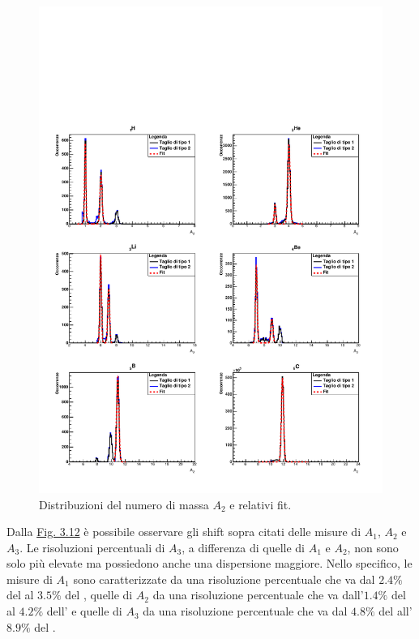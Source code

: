 \documentclass[12pt,a4paper,twoside]{report}
\begin{document}
	\begin{figure}[H]
		\centering
		\includegraphics[width=1.\linewidth]{c_Total_black_blue2.pdf}
		\caption{Distribuzioni del numero di massa $A_2$ e relativi fit.}
		\label{fig:a2_fragments_final}
	\end{figure}
	Dalla \hyperref[fig:number_mass_resolution]{Fig. 3.12} è possibile osservare gli shift sopra citati delle misure di $A_1$, $A_2$ e $A_3$. Le risoluzioni percentuali di $A_3$, a differenza di quelle di $A_1$ e $A_2$, non sono solo più elevate ma possiedono anche una dispersione maggiore. Nello specifico, le misure di $A_1$ sono caratterizzate da una risoluzione percentuale che va dal $2.4\%$ del  al $3.5\%$ del , quelle di $A_2$ da una risoluzione percentuale che va dall'$1.4\%$ del  al $4.2\%$ dell' e quelle di $A_3$ da una risoluzione percentuale che va dal $4.8\%$ del  all'$8.9\%$ del .
\end{document}
